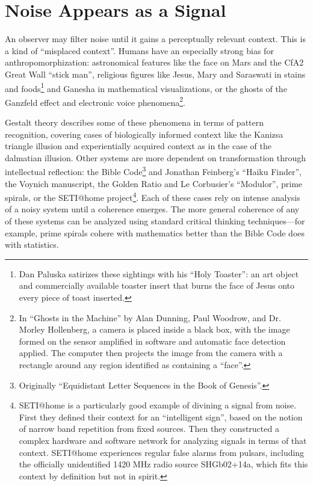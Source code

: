 \documentclass{thesis}
\begin{document}
\section{Noise Appears as a Signal}

An observer may filter noise until it gains a perceptually relevant context. This is a kind of ``misplaced context''. Humans have an especially strong bias for anthropomorphization: astronomical features like the face on Mars\cite{brian_dunning_facemars_2008} and the CfA2 Great Wall ``stick man''\cite{de_lapparent_slice_1986}, religious figures like Jesus, Mary and Saraswati in stains and foods\cite{boston.com_religious_????}\footnote{Dan Paluska satirizes these sightings with his ``Holy Toaster''\cite{dan_paluska_holy_2005}: an art object and commercially available toaster insert that burns the face of Jesus onto every piece of toast inserted.} and Ganesha in mathematical visualizations\cite{melinda_green_buddhabrot_1993}, or the ghosts of the Ganzfeld effect and electronic voice phenomena\footnote{In ``Ghosts in the Machine'' by Alan Dunning, Paul Woodrow, and Dr. Morley Hollenberg\cite{alan_dunning_paul_woodrow_and_morley_hollenberg_einsteins_2008}, a camera is placed inside a black box, with the image formed on the sensor amplified in software and automatic face detection applied. The computer then projects the image from the camera with a rectangle around any region identified as containing a ``face''.}.

Gestalt theory describes some of these phenomena in terms of pattern recognition, covering cases of biologically informed context like the Kanizsa triangle illusion\cite{alexander_bogomolny_kanizsa_????} and experientially acquired context as in the case of the dalmatian illusion\cite{michael_bach_dalmatian_2002}. Other systems are more dependent on transformation through intellectual reflection: the Bible Code\footnote{Originally ``Equidistant Letter Sequences in the Book of Genesis''\cite{rips_equidistant_1994}.} and Jonathan Feinberg's ``Haiku Finder'', the Voynich manuscript\cite{robin_mckie_secret_2004}, the Golden Ratio\cite{Doczi81}\cite{markowsky_misconceptions_1992} and Le Corbusier's ``Modulor''\cite{padovan_proportion_1999}, prime spirals\cite{michael_m._ross_natural_2007}\cite{weisstein_prime_????}, or the SETI@home project\cite{seti_about_????}\footnote{SETI@home is a particularly good example of divining a signal from noise. First they defined their context for an ``intelligent sign'', based on the notion of narrow band repetition from fixed sources. Then they constructed a complex hardware and software network for analyzing signals in terms of that context. SETI@home experiences regular false alarms from pulsars, including the officially unidentified 1420 MHz radio source SHGb02+14a\cite{eugenie_samuel_reich_mysterious_2004}, which fits this context by definition but not in spirit.}. Each of these cases rely on intense analysis of a noisy system until a coherence emerges. The more general coherence of any of these systems can be analyzed using standard critical thinking techniques\cite{Moore07}---for example, prime spirals cohere with mathematics better than the Bible Code does with statistics.
\end{document}
